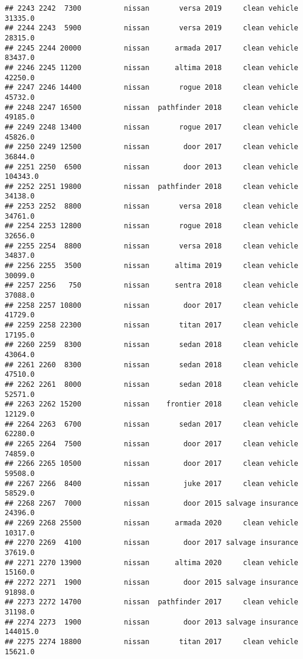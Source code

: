 \documentclass[
]{article}
\begin{document}
\begin{verbatim}
## 2243 2242  7300          nissan       versa 2019     clean vehicle   31335.0
## 2244 2243  5900          nissan       versa 2019     clean vehicle   28315.0
## 2245 2244 20000          nissan      armada 2017     clean vehicle   83437.0
## 2246 2245 11200          nissan      altima 2018     clean vehicle   42250.0
## 2247 2246 14400          nissan       rogue 2018     clean vehicle   45732.0
## 2248 2247 16500          nissan  pathfinder 2018     clean vehicle   49185.0
## 2249 2248 13400          nissan       rogue 2017     clean vehicle   45826.0
## 2250 2249 12500          nissan        door 2017     clean vehicle   36844.0
## 2251 2250  6500          nissan        door 2013     clean vehicle  104343.0
## 2252 2251 19800          nissan  pathfinder 2018     clean vehicle   34138.0
## 2253 2252  8800          nissan       versa 2018     clean vehicle   34761.0
## 2254 2253 12800          nissan       rogue 2018     clean vehicle   32656.0
## 2255 2254  8800          nissan       versa 2018     clean vehicle   34837.0
## 2256 2255  3500          nissan      altima 2019     clean vehicle   30099.0
## 2257 2256   750          nissan      sentra 2018     clean vehicle   37088.0
## 2258 2257 10800          nissan        door 2017     clean vehicle   41729.0
## 2259 2258 22300          nissan       titan 2017     clean vehicle   17195.0
## 2260 2259  8300          nissan       sedan 2018     clean vehicle   43064.0
## 2261 2260  8300          nissan       sedan 2018     clean vehicle   47510.0
## 2262 2261  8000          nissan       sedan 2018     clean vehicle   52571.0
## 2263 2262 15200          nissan    frontier 2018     clean vehicle   12129.0
## 2264 2263  6700          nissan       sedan 2017     clean vehicle   62280.0
## 2265 2264  7500          nissan        door 2017     clean vehicle   74859.0
## 2266 2265 10500          nissan        door 2017     clean vehicle   59508.0
## 2267 2266  8400          nissan        juke 2017     clean vehicle   58529.0
## 2268 2267  7000          nissan        door 2015 salvage insurance   24396.0
## 2269 2268 25500          nissan      armada 2020     clean vehicle   10317.0
## 2270 2269  4100          nissan        door 2017 salvage insurance   37619.0
## 2271 2270 13900          nissan      altima 2020     clean vehicle   15160.0
## 2272 2271  1900          nissan        door 2015 salvage insurance   91898.0
## 2273 2272 14700          nissan  pathfinder 2017     clean vehicle   31198.0
## 2274 2273  1900          nissan        door 2013 salvage insurance  144015.0
## 2275 2274 18800          nissan       titan 2017     clean vehicle   15621.0

\end{verbatim}
\end{document}
